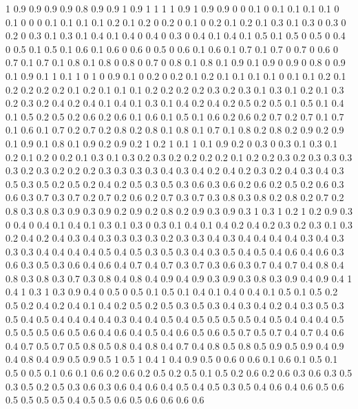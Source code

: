 1 0.9
0.9 0.9
0.9 0.8
0.9 0.9
1 0.9
1 1
1 1
0.9 1
0.9 0.9
0 0
0.1 0
0.1 0.1
0.1 0.1
0 0.1
0 0
0 0.1
0.1 0.1
0.1 0.2
0.1 0.2
0 0.2
0 0.1
0 0.2
0.1 0.2
0.1 0.3
0.1 0.3
0 0.3
0 0.2
0 0.3
0.1 0.3
0.1 0.4
0.1 0.4
0 0.4
0 0.3
0 0.4
0.1 0.4
0.1 0.5
0.1 0.5
0 0.5
0 0.4
0 0.5
0.1 0.5
0.1 0.6
0.1 0.6
0 0.6
0 0.5
0 0.6
0.1 0.6
0.1 0.7
0.1 0.7
0 0.7
0 0.6
0 0.7
0.1 0.7
0.1 0.8
0.1 0.8
0 0.8
0 0.7
0 0.8
0.1 0.8
0.1 0.9
0.1 0.9
0 0.9
0 0.8
0 0.9
0.1 0.9
0.1 1
0.1 1
0 1
0 0.9
0.1 0
0.2 0
0.2 0.1
0.2 0.1
0.1 0.1
0.1 0
0.1 0.1
0.2 0.1
0.2 0.2
0.2 0.2
0.1 0.2
0.1 0.1
0.1 0.2
0.2 0.2
0.2 0.3
0.2 0.3
0.1 0.3
0.1 0.2
0.1 0.3
0.2 0.3
0.2 0.4
0.2 0.4
0.1 0.4
0.1 0.3
0.1 0.4
0.2 0.4
0.2 0.5
0.2 0.5
0.1 0.5
0.1 0.4
0.1 0.5
0.2 0.5
0.2 0.6
0.2 0.6
0.1 0.6
0.1 0.5
0.1 0.6
0.2 0.6
0.2 0.7
0.2 0.7
0.1 0.7
0.1 0.6
0.1 0.7
0.2 0.7
0.2 0.8
0.2 0.8
0.1 0.8
0.1 0.7
0.1 0.8
0.2 0.8
0.2 0.9
0.2 0.9
0.1 0.9
0.1 0.8
0.1 0.9
0.2 0.9
0.2 1
0.2 1
0.1 1
0.1 0.9
0.2 0
0.3 0
0.3 0.1
0.3 0.1
0.2 0.1
0.2 0
0.2 0.1
0.3 0.1
0.3 0.2
0.3 0.2
0.2 0.2
0.2 0.1
0.2 0.2
0.3 0.2
0.3 0.3
0.3 0.3
0.2 0.3
0.2 0.2
0.2 0.3
0.3 0.3
0.3 0.4
0.3 0.4
0.2 0.4
0.2 0.3
0.2 0.4
0.3 0.4
0.3 0.5
0.3 0.5
0.2 0.5
0.2 0.4
0.2 0.5
0.3 0.5
0.3 0.6
0.3 0.6
0.2 0.6
0.2 0.5
0.2 0.6
0.3 0.6
0.3 0.7
0.3 0.7
0.2 0.7
0.2 0.6
0.2 0.7
0.3 0.7
0.3 0.8
0.3 0.8
0.2 0.8
0.2 0.7
0.2 0.8
0.3 0.8
0.3 0.9
0.3 0.9
0.2 0.9
0.2 0.8
0.2 0.9
0.3 0.9
0.3 1
0.3 1
0.2 1
0.2 0.9
0.3 0
0.4 0
0.4 0.1
0.4 0.1
0.3 0.1
0.3 0
0.3 0.1
0.4 0.1
0.4 0.2
0.4 0.2
0.3 0.2
0.3 0.1
0.3 0.2
0.4 0.2
0.4 0.3
0.4 0.3
0.3 0.3
0.3 0.2
0.3 0.3
0.4 0.3
0.4 0.4
0.4 0.4
0.3 0.4
0.3 0.3
0.3 0.4
0.4 0.4
0.4 0.5
0.4 0.5
0.3 0.5
0.3 0.4
0.3 0.5
0.4 0.5
0.4 0.6
0.4 0.6
0.3 0.6
0.3 0.5
0.3 0.6
0.4 0.6
0.4 0.7
0.4 0.7
0.3 0.7
0.3 0.6
0.3 0.7
0.4 0.7
0.4 0.8
0.4 0.8
0.3 0.8
0.3 0.7
0.3 0.8
0.4 0.8
0.4 0.9
0.4 0.9
0.3 0.9
0.3 0.8
0.3 0.9
0.4 0.9
0.4 1
0.4 1
0.3 1
0.3 0.9
0.4 0
0.5 0
0.5 0.1
0.5 0.1
0.4 0.1
0.4 0
0.4 0.1
0.5 0.1
0.5 0.2
0.5 0.2
0.4 0.2
0.4 0.1
0.4 0.2
0.5 0.2
0.5 0.3
0.5 0.3
0.4 0.3
0.4 0.2
0.4 0.3
0.5 0.3
0.5 0.4
0.5 0.4
0.4 0.4
0.4 0.3
0.4 0.4
0.5 0.4
0.5 0.5
0.5 0.5
0.4 0.5
0.4 0.4
0.4 0.5
0.5 0.5
0.5 0.6
0.5 0.6
0.4 0.6
0.4 0.5
0.4 0.6
0.5 0.6
0.5 0.7
0.5 0.7
0.4 0.7
0.4 0.6
0.4 0.7
0.5 0.7
0.5 0.8
0.5 0.8
0.4 0.8
0.4 0.7
0.4 0.8
0.5 0.8
0.5 0.9
0.5 0.9
0.4 0.9
0.4 0.8
0.4 0.9
0.5 0.9
0.5 1
0.5 1
0.4 1
0.4 0.9
0.5 0
0.6 0
0.6 0.1
0.6 0.1
0.5 0.1
0.5 0
0.5 0.1
0.6 0.1
0.6 0.2
0.6 0.2
0.5 0.2
0.5 0.1
0.5 0.2
0.6 0.2
0.6 0.3
0.6 0.3
0.5 0.3
0.5 0.2
0.5 0.3
0.6 0.3
0.6 0.4
0.6 0.4
0.5 0.4
0.5 0.3
0.5 0.4
0.6 0.4
0.6 0.5
0.6 0.5
0.5 0.5
0.5 0.4
0.5 0.5
0.6 0.5
0.6 0.6
0.6 0.6
